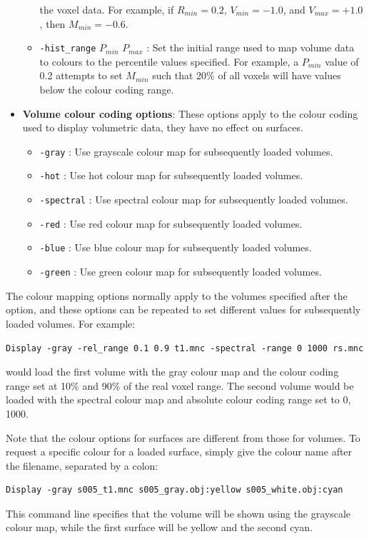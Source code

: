 \documentclass[11pt,letterpaper]{article}
\newcommand{\ident}[1]{{\tt #1}}
\begin{document}
\begin{itemize}
\begin{itemize}
  the voxel data. For example, if $R_{min}=0.2$, $V_{min}=-1.0$, and 
  $V_{max}=+1.0$, then $M_{min}=-0.6$.
\item \ident{-hist\_range} $P_{min}$ $P_{max}$ : Set the initial range used to
  map volume data to colours to the percentile values specified. For
  example, a $P_{min}$ value of 0.2 attempts to set $M_{min}$ such that
  20\% of all voxels will have values below the colour coding range.
\end{itemize}
\item {\bf Volume colour coding options}:
These options apply to the colour coding used to display volumetric
data, they have no effect on surfaces.
\begin{itemize}
\item \ident{-gray} : Use grayscale colour map for subsequently loaded volumes.
\item \ident{-hot} : Use hot colour map for subsequently loaded volumes.
\item \ident{-spectral} : Use spectral colour map for subsequently loaded volumes.
\item \ident{-red} : Use red colour map for subsequently loaded volumes.
\item \ident{-blue} : Use blue colour map for subsequently loaded volumes.
\item \ident{-green} : Use green colour map for subsequently loaded
  volumes.
\end{itemize}
\end{itemize}

The colour mapping options normally apply to the volumes specified after
the option, and these options can be repeated to set different values
for subsequently loaded volumes. For example:

\begin{verbatim}
Display -gray -rel_range 0.1 0.9 t1.mnc -spectral -range 0 1000 rs.mnc
\end{verbatim}
would load the first volume with the gray colour map and
the colour coding range set at 10\% and 90\% of the real voxel
range. The second volume would be loaded with the spectral colour map
and absolute colour coding range set to 0, 1000.

Note that the colour options for surfaces are different from those for
volumes. To request a specific colour for a loaded surface, simply give
the colour name after the filename, separated by a colon:

\begin{verbatim}
Display -gray s005_t1.mnc s005_gray.obj:yellow s005_white.obj:cyan
\end{verbatim}
This command line specifies that the volume will be shown using the
grayscale colour map, while the first surface will be yellow and the
second cyan.
\end{document}
